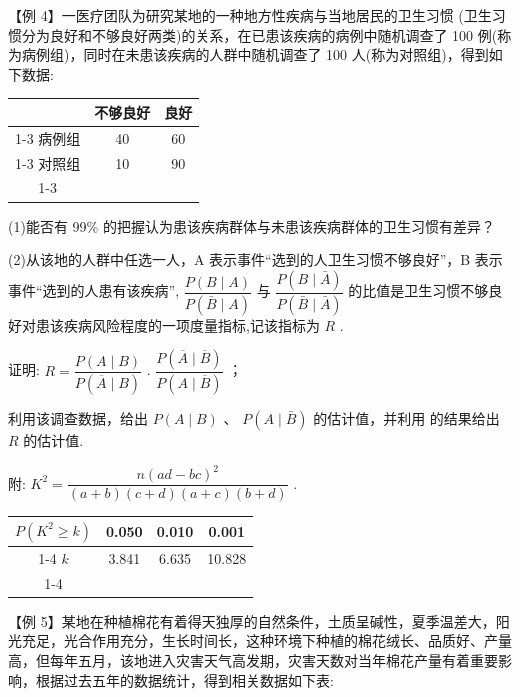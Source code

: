 【例 4】一医疗团队为研究某地的一种地方性疾病与当地居民的卫生习惯 (卫生习惯分为良好和不够良好两类)的关系，在已患该疾病的病例中随机调查了 100 例(称为病例组)，同时在未患该疾病的人群中随机调查了 100 人(称为对照组)，得到如下数据:

\begin{center}
\begin{tabular}{|c|c|c|}
\hline
\phantom{X} & 不够良好 & 良好 \\
\cline{1-3}
病例组 & 40 & 60 \\
\cline{1-3}
对照组 & 10 & 90 \\
\cline{1-3}
\hline
\end{tabular}
\end{center}

(1)能否有 99\% 的把握认为患该疾病群体与未患该疾病群体的卫生习惯有差异？

(2)从该地的人群中任选一人，A 表示事件“选到的人卫生习惯不够良好”，B 表示事件“选到的人患有该疾病”, $\dfrac{P\left( {B \mid  A}\right) }{P\left( {\bar{B} \mid  A}\right) }$ 与 $\dfrac{P\left( {B \mid  \bar{A}}\right) }{P\left( {\bar{B} \mid  \bar{A}}\right) }$ 的比值是卫生习惯不够良好对患该疾病风险程度的一项度量指标,记该指标为 $R$ .

   证明: $R = \dfrac{P\left( {A \mid  B}\right) }{P\left( {\overline{A} \mid  B}\right) }$ . $\dfrac{P\left( {\overline{A} \mid  \overline{B}}\right) }{P\left( {A \mid  \overline{B}}\right) }$ ；

   利用该调查数据，给出 $P\left( {A \mid  B}\right)$ 、 $P\left( {A \mid  \bar{B}}\right)$ 的估计值，并利用  的结果给出 $R$ 的估计值.

附: ${K}^{2} = \dfrac{n{\left( ad - bc\right) }^{2}}{\left( {a + b}\right) \left( {c + d}\right) \left( {a + c}\right) \left( {b + d}\right) }$ .

\begin{center}
\begin{tabular}{|c|c|c|c|}
\hline
$P\left( {{K}^{2} \geq  k}\right)$ & 0.050 & 0.010 & 0.001 \\
\cline{1-4}
$k$ & 3.841 & 6.635 & 10.828 \\
\cline{1-4}
\hline
\end{tabular}
\end{center}

【例 5】某地在种植棉花有着得天独厚的自然条件，土质呈碱性，夏季温差大，阳光充足，光合作用充分，生长时间长，这种环境下种植的棉花绒长、品质好、产量高，但每年五月，该地进入灾害天气高发期，灾害天数对当年棉花产量有着重要影响，根据过去五年的数据统计，得到相关数据如下表:

